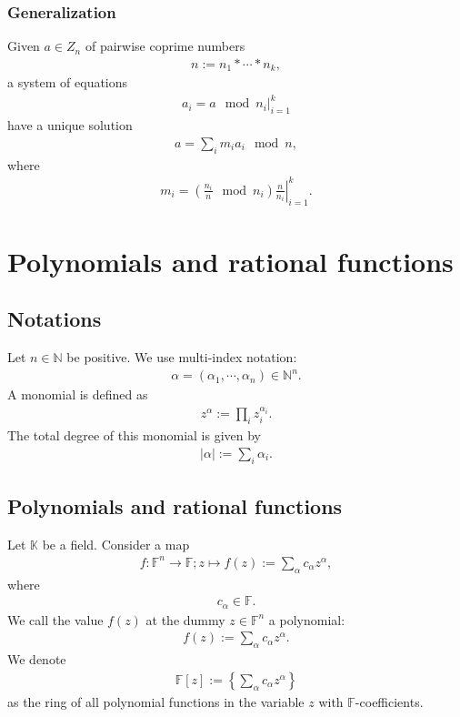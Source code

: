 \documentclass[11pt]{book}
\begin{document}
\subsubsection{Generalization}
Given $a \in Z_n$ of pairwise coprime numbers
\begin{eqnarray}
n := n_1 * \cdots * n_k,
\end{eqnarray}
a system of equations
\begin{eqnarray}
\left. a_i = a \mod n_i \right|_{i=1}^k
\end{eqnarray}
have a unique solution
\begin{eqnarray}
a = \sum_i m_i a_i \mod n,
\end{eqnarray}
where
\begin{eqnarray}
\left. m_i = \left( \frac{n_i}{n} \mod n_i \right) \frac{n}{n_i} \right|_{i=1}^k.
\end{eqnarray}

\section{Polynomials and rational functions}

\subsection{Notations}
Let $n \in \mathbb{N}$ be positive. 
We use multi-index notation:
\begin{eqnarray}
\alpha = (\alpha_1, \cdots, \alpha_n) \in \mathbb{N}^n.
\end{eqnarray}
A monomial is defined as
\begin{eqnarray}
z^\alpha := \prod_i z_i^{\alpha_i}.
\end{eqnarray}
The total degree of this monomial is given by
\begin{eqnarray}
|\alpha| := \sum_i \alpha_i.
\end{eqnarray}

\subsection{Polynomials and rational functions}
Let $\mathbb{K}$ be a field.
Consider a map
\begin{eqnarray}
f : \mathbb{F}^n \to \mathbb{F}; z \mapsto f(z) := \sum_\alpha c_\alpha z^\alpha,
\end{eqnarray}
where
\begin{eqnarray}
c_\alpha \in \mathbb{F}.
\end{eqnarray}
We call the value $f(z)$ at the dummy $z \in \mathbb{F}^n$ a polynomial:
\begin{eqnarray}
f(z) := \sum_\alpha c_\alpha z^\alpha.
\end{eqnarray}
We denote
\begin{eqnarray}
\mathbb{F}[z] := \left\{ \sum_\alpha c_\alpha z^\alpha \right\}
\end{eqnarray}
as the ring of all polynomial functions in the variable $z$ with $\mathbb{F}$-coefficients.
\end{document}
